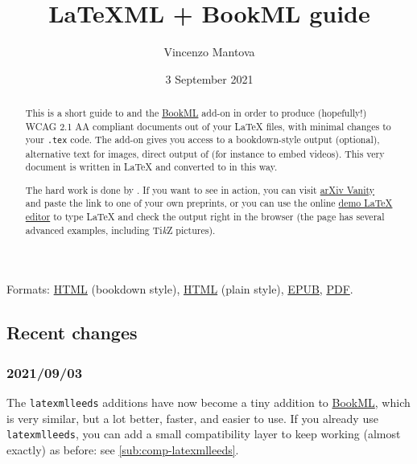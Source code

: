 \documentclass[a4paper]{article}
\title{LaTeXML + BookML guide}
\author{Vincenzo Mantova}
\date{3 September 2021}
\def\tikzname{Ti\emph{k}Z}
\theoremstyle{definition}
\begin{document}
\maketitle

\begin{abstract}
  This is a short guide to \LaTeXML{} and the \href{https://vlmantova.github.io/bookml/}{BookML} add-on in order to produce (hopefully!) WCAG 2.1 AA compliant documents out of your \LaTeX{} files, with minimal changes to your \verb|.tex| code. The add-on gives you access to a bookdown-style output (optional), alternative text for images, direct output of \HTML{} (for instance to embed videos). This very document is written in \LaTeX{} and converted to \HTML{} in this way.

  The hard work is done by \LaTeXML{}. If you want to see \LaTeXML{} in action, you can visit \href{https://www.arxiv-vanity.com/}{arXiv Vanity} and paste the link to one of your own preprints, or you can use the online \href{https://latexml.mathweb.org/editor}{demo \LaTeX{} editor} to type \LaTeX{} and check the \HTML{} output right in the browser (the page has several advanced examples, including \tikzname{} pictures).
\end{abstract}

\begin{center}
  Formats: \href{https://minerva.leeds.ac.uk/bbcswebdav/courses/201920_MAPS_MM8863/latexmlleeds/}{HTML} (bookdown style), \href{https://minerva.leeds.ac.uk/bbcswebdav/courses/201920_MAPS_MM8863/latexmlleeds/index.plain.html}{HTML} (plain style), \href{https://minerva.leeds.ac.uk/bbcswebdav/courses/201920_MAPS_MM8863/latexmlleeds/LaTeXML-Leeds.epub}{EPUB}, \href{https://minerva.leeds.ac.uk/bbcswebdav/courses/201920_MAPS_MM8863/latexmlleeds/LaTeXML-Leeds.pdf}{PDF}.
\end{center}

\subsection*{Recent changes}
\subsubsection*{2021/09/03}
The \texttt{latexmlleeds} additions have now become a tiny addition to \href{https://vlmantova.github.io/bookml/}{BookML}, which is very similar, but a lot better, faster, and easier to use. If you already use \texttt{latexmlleeds}, you can add a small compatibility layer to keep working (almost exactly) as before: see \autoref{sub:comp-latexmlleeds}.
\end{document}
